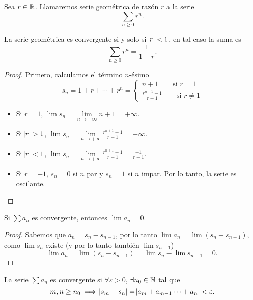 \begin{defi}
    Sea $r \in \mathbb{R}$. Llamaremos serie geométrica de razón $r$ a la serie
    \[
        \sum_{n \geq 0} r^n.
    \]
\end{defi}

\begin{prop}
    La serie geométrica es convergente si y solo si $\abs{r} < 1$, en tal caso
    la suma es
    \[
        \sum_{n \geq 0} r^n = \frac{1}{1-r}.
    \]
\end{prop}

\begin{proof}
    Primero, calculamos el término $n$-ésimo
    \[
        s_n = 1 + r + \cdots + r^n = \begin{cases}
            n+1 \qquad \text{si } r = 1 \\
            \frac{r^{n+1} - 1 }{r-1} \qquad \text{si } r \neq 1
        \end{cases}
    \]
    \begin{itemize}
        \item Si $r = 1$, $\lim s_n = \lim\limits_{n  \to +\infty} n+1 = +\infty$.
        \item Si $\abs{r} > 1$, $\lim s_n = \lim\limits_{n \to +\infty}
            \frac{r^{n+1} - 1}{r-1} = +\infty$.
        \item Si $\abs{r} < 1$, $\lim s_n = \lim\limits_{n \to +\infty}
            \frac{r^{n+1} - 1}{r-1} = \frac{-1}{r-1}$.
        \item Si $r = -1$, $s_n = 0$ si $n$ par y $s_n = 1$ si $n$ impar. Por
            lo tanto, la serie es oscilante.
    \end{itemize}
\end{proof}

\begin{prop}
    Si $\sum a_n$ es convergente, entonces $\lim a_n = 0$.
\end{prop}

\begin{proof}
    Sabemos que $a_n = s_n - s_{n-1}$, por lo tanto
    $\lim a_n = \lim (s_n - s_{n-1})$, como $\lim s_n$ existe (y por lo tanto
    también $\lim s_{n-1}$)
    \[
        \lim a_n = \lim (s_n - s_{n-1}) = \lim s_n - \lim s_{n-1} = 0.
    \]
\end{proof}

\begin{prop}
    La serie $\sum a_n$ es convergente si $\forall\varepsilon>0$,
    $\exists n_0 \in \mathbb{N}$
    tal que
    \[
        m,n \geq n_0 \implies \abs{s_m - s_n} = \abs{a_m + a_{m-1} \cdots + a_n} <
        \varepsilon.
    \]
\end{prop}

